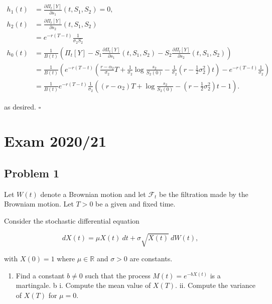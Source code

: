 \documentclass[
]{book}
\providecommand{\tightlist}{%
  \setlength{\itemsep}{0pt}\setlength{\parskip}{0pt}}
\begin{document}
\begin{align*}
h_1(t)&=\frac{\partial \Pi_t[Y]}{\partial s_1}(t,S_1,S_2)=0,\\
h_2(t)&=\frac{\partial \Pi_t[Y]}{\partial s_2}(t,S_1,S_2)\\
&=e^{-r(T-t)}\frac{1}{\sigma_2S_2}\\
h_0(t) &=\frac{1}{B(t)}\left(\Pi_t[Y]-S_1\frac{\partial \Pi_t[Y]}{\partial s_1}(t,S_1,S_2)-S_2\frac{\partial \Pi_t[Y]}{\partial s_2}(t,S_1,S_2)\right) \\
&=\frac{1}{B(t)}\left(e^{-r(T-t)}\left(\frac{r-\alpha_2}{\sigma_2} T+\frac{1}{\sigma_2}\log\frac{s_2}{S_2(0)}-\frac{1}{\sigma_2}\left(r-\frac{1}{2}\sigma_2^2\right)t\right)-e^{-r(T-t)}\frac{1}{\sigma_2}\right)\\
&=\frac{1}{B(t)}e^{-r(T-t)}\frac{1}{\sigma_2}\left((r-\alpha_2) T+\log\frac{s_2}{S_2(0)}-\left(r-\frac{1}{2}\sigma_2^2\right)t-1\right).
\end{align*}

as desired. \(\square\)

\noindent\makebox[\linewidth]{\rule{\textwidth}{0.4pt}}
\pagebreak

\hypertarget{exam-202021}{%
\section{Exam 2020/21}\label{exam-202021}}

\hypertarget{problem-1-3}{%
\subsection{Problem 1}\label{problem-1-3}}

Let \(W(t)\) denote a Brownian motion and let \(\mathcal{F}_t\) be the filtration made by the Browniam motion. Let \(T>0\) be a given and fixed time.

Consider the stochastic differential equation

\[
dX(t)=\mu X(t)\ dt+\sigma\sqrt{X(t)}\ dW(t),
\]

with \(X(0)=1\) where \(\mu\in \mathbb{R}\) and \(\sigma >0\) are constants.

\begin{enumerate}
\def\labelenumi{\alph{enumi}.}
\tightlist
\item
  Find a constant \(b\ne 0\) such that the process \(M(t)=e^{-bX(t)}\) is a martingale.
  b
  i. Compute the mean value of \(X(T)\).
  ii. Compute the variance of \(X(T)\) for \(\mu=0\).
\end{enumerate}
\end{document}
